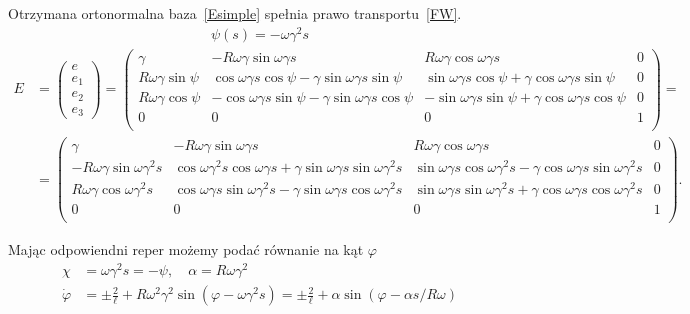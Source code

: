 Otrzymana ortonormalna baza~\eqref{Esimple} spełnia 
prawo transportu~\eqref{FW}.
\begin{align}\label{PsiSimple}
\psi (s) = -\omega \gamma^2 s
\end{align}
\begin{align}\label{Esimple}
E&=
\begin{pmatrix}
e\\
e_1\\
e_2\\
e_3
\end{pmatrix}
=
\begin{pmatrix}
\gamma  & -R\omega\gamma \sin \omega \gamma s 
& R\omega\gamma \cos\omega\gamma s         & 0 \\
R\omega\gamma \sin \psi  
&  \cos\omega\gamma s \cos\psi 
-\gamma \sin \omega\gamma s \sin\psi &  
\sin\omega\gamma s \cos\psi
+\gamma \cos\omega\gamma s\sin \psi & 0 \\
R\omega\gamma \cos\psi      &  
-\cos\omega\gamma s \sin\psi 
- \gamma \sin\omega\gamma s \cos\psi   &  
-\sin\omega\gamma s \sin\psi 
+ \gamma \cos\omega\gamma s \cos\psi & 0 \\
0 & 0 & 0 & 1 \\
\end{pmatrix} 
=
\\
&=\nonumber
\begin{pmatrix} 
\gamma  & -R\omega\gamma \sin \omega \gamma s 
& R\omega\gamma \cos\omega\gamma s         & 0 \\
-R\omega\gamma \sin\omega\gamma^2 s  
&  \cos\omega\gamma^2 s\cos\omega\gamma s + 
\gamma \sin \omega\gamma s \sin\omega\gamma^2 s &  
\sin\omega\gamma s \cos\omega\gamma^2 s 
- \gamma \cos\omega\gamma s\sin \omega\gamma^2 s & 0 \\
R\omega\gamma \cos\omega\gamma^2 s       &  
\cos\omega\gamma s \sin\omega\gamma^2 s 
- \gamma \sin\omega\gamma s \cos\omega\gamma^2 s   &  
\sin\omega\gamma s \sin\omega\gamma^2 s 
+ \gamma \cos\omega\gamma s \cos\omega\gamma^2 s & 0 \\
0 & 0 & 0 & 1 \\
\end{pmatrix}.
\end{align}

Mając odpowiendni reper możemy podać równanie na kąt $\varphi$
\begin{align}\nonumber
\chi &= \omega \gamma^2 s = - \psi, \quad \alpha = R \omega \gamma^2 \\
\dot{\varphi} &= \pm \frac{2}{\ell} + \label{phiSimple}
R \omega^2 \gamma^2\sin (\varphi - \omega\gamma^2 s )
= \pm \frac{2}{\ell} +\alpha \sin (\varphi - \alpha s / R\omega ) 
\end{align}

